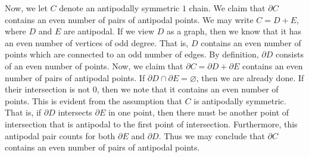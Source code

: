 \documentclass[12pt]{article}
\begin{document}
Now, we let $C$ denote an antipodally symmetric $1$ chain. We claim that $\partial{C}$ contains an even number of pairs of antipodal points. We may write $C = D + E$, where $D$ and $E$ are antipodal. If we view $D$ as a graph, then we know that it has an even number of vertices of odd degree. That is, $D$ contains an even number of points which are connected to an odd number of edges. By definition, $\partial{D}$ consists of an even number of points. Now, we claim that $\partial{C} = \partial{D} + \partial{E}$ contains an even number of pairs of antipodal points. If $\partial{D} \cap \partial{E} = \varnothing$, then we are already done. If their intersection is not $0$, then we note that it contains an even number of points. This is evident from the assumption that $C$ is antipodally symmetric. That is, if $\partial{D}$ intersects $\partial{E}$ in one point, then there must be another point of intersection that is antipodal to the first point of intersection. Furthermore, this antipodal pair counts for both $\partial{E}$ and $\partial{D}$. Thus we may conclude that $\partial{C}$ contains an even number of pairs of antipodal points.
\end{document}
